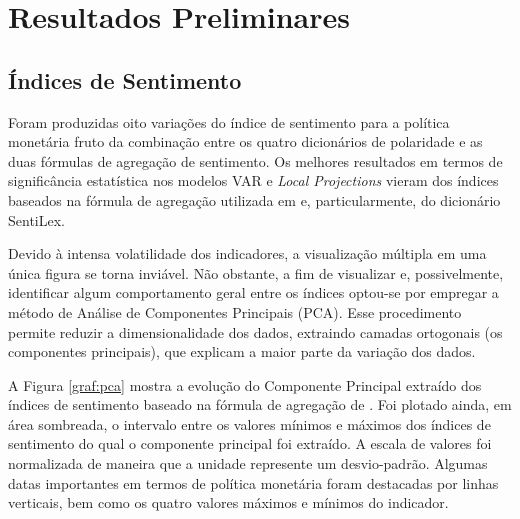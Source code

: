 

\chapter{Resultados Preliminares} 
\label{resultados_preliminares}

\section{Índices de Sentimento}

Foram produzidas oito variações do índice de sentimento para a política monetária fruto da combinação entre os quatro dicionários de polaridade e as duas fórmulas de agregação de sentimento. Os melhores resultados em termos de significância estatística nos modelos VAR e \textit{Local Projections} vieram dos índices baseados na fórmula de agregação utilizada em \textcite{carosia_analyzing_2020} e, particularmente, do dicionário SentiLex. 

Devido à intensa volatilidade dos indicadores, a visualização múltipla em uma única figura se torna inviável. Não obstante, a fim de visualizar e, possivelmente, identificar algum comportamento geral entre os índices optou-se por empregar a método de Análise de Componentes Principais (PCA). Esse procedimento permite reduzir a dimensionalidade dos dados, extraindo camadas ortogonais (os componentes principais), que explicam a maior parte da variação dos dados.

A Figura \ref{graf:pca} mostra a evolução do Componente Principal extraído dos índices de sentimento baseado na fórmula de agregação de  \textcite{carosia_analyzing_2020}. Foi plotado ainda, em área sombreada, o intervalo entre os valores mínimos e máximos dos índices de sentimento do qual o componente principal foi extraído. A escala de valores foi normalizada de maneira que a unidade represente um desvio-padrão. Algumas datas importantes em termos de política monetária foram destacadas por linhas verticais, bem como os quatro valores máximos e mínimos do indicador.  

